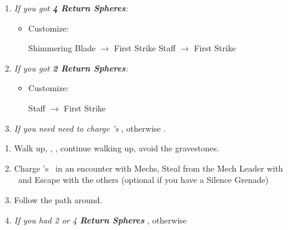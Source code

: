\begin{enumerate}[resume]
    \item \textit{If you got \textbf{4 Return Spheres}:}
    \begin{itemize}
        \item Customize:
        \begin{itemize}
            \auronf Shimmering Blade $\rightarrow$ First Strike
            \yunaf Staff $\rightarrow$ First Strike
        \end{itemize}
    \end{itemize}
    \item \textit{If you got \textbf{2 Return Spheres}:}
    \begin{itemize}
        \item Customize:
        \begin{itemize}
            \yunaf Staff $\rightarrow$ First Strike
        \end{itemize}
    \end{itemize}
    \item \textit{If you need need to charge \rikku's \od} \formation{\tidus}{\rikku}{\auron}, otherwise \formation{\tidus}{\kimahri}{\wakka}.
\end{enumerate}
\begin{enumerate}[resume]
    \item Walk up, \sd, \cs[1:20], continue walking up, avoid the gravestones.
    \item Charge \rikku's \od\ in an encounter with Mechs, Steal from the Mech Leader with \rikku\ and Escape with the others (optional if you have a Silence Grenade)
    \item Follow the path around.
    \item \textit{If you had 2 or 4 \textbf{Return Spheres}} \formation{\tidus}{\yuna}{\auron}, otherwise \formation{\tidus}{\kimahri}{\wakka}
\end{enumerate}
